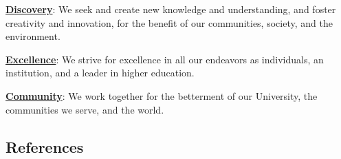 \documentclass[
  letterpaper,
  DIV=11,
  numbers=noendperiod]{scrartcl}
\begin{document}
\href{http://universityethics.psu.edu/examples-action\#discoveryexamples}{\textbf{Discovery}}:
We seek and create new knowledge and understanding, and foster
creativity and innovation, for the benefit of our communities, society,
and the environment.

\href{http://universityethics.psu.edu/examples-action\#excellenceexamples}{\textbf{Excellence}}:
We strive for excellence in all our endeavors as individuals, an
institution, and a leader in higher education.

\href{http://universityethics.psu.edu/examples-action\#communityexamples}{\textbf{Community}}:
We work together for the betterment of our University, the communities
we serve, and the world.

\subsection*{References}\label{references}
\end{document}
